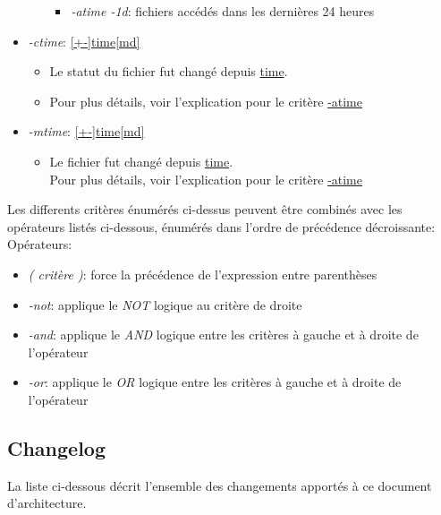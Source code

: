 \documentclass[11pt, a4paper]{article}
\begin{document}
\begin{itemize}
\begin{itemize}
\begin{itemize}
			\item \textit{-atime -1d}: fichiers accédés dans les dernières 24 heures
		\end{itemize}
	\end{itemize}
	\item \textit{-ctime}: \underline{[+-]time[md]}
	\begin{itemize}
		\item 	Le statut du fichier fut changé depuis \underline{time}.
		\item Pour plus détails, voir l'explication pour le critère \underline{-atime}
	\end{itemize}
	\item \textit{-mtime}: \underline{[+-]time[md]}
	\begin{itemize}
		\item 	Le fichier fut changé depuis \underline{time}.\\
		Pour plus détails, voir l'explication pour le critère \underline{-atime} \\
	\end{itemize}
\end{itemize}

Les differents critères énumérés ci-dessus peuvent être combinés avec les opérateurs listés ci-dessous,
énumérés dans l'ordre de précédence décroissante: \\

Opérateurs:
\begin{itemize}
	\renewcommand\labelitemi{}
	\item \textit{( critère )}: force la précédence de l'expression entre parenthèses
	\item \textit{-not}: applique le \textit{NOT} logique  au critère de droite
	\item \textit{-and}: applique le \textit{AND} logique entre les critères à gauche et à droite de l'opérateur
	\item \textit{-or}: applique le \textit{OR} logique  entre les critères à gauche et à droite de l'opérateur
\end{itemize}

\newpage

\subsection{Changelog}

La liste ci-dessous décrit l'ensemble des changements apportés à ce document d'architecture.
\end{document}
